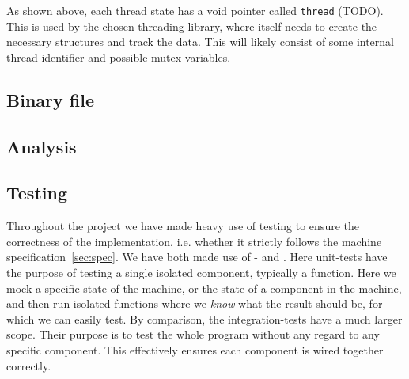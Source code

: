 As shown above, each thread state has a void pointer called {\tt thread}
(TODO). This is used by the chosen threading library, where itself needs to
create the necessary structures and track the data. This will likely consist of
some internal thread identifier and possible mutex variables.


\subsection{Binary file}








\subsection{Analysis}

\subsection{Testing}


Throughout the project we have made heavy use of testing to ensure the
correctness of the implementation, i.e. whether it strictly follows the machine
specification~\ref{sec:spec}. We have both made use of - and
. Here unit-tests have the purpose of testing a single
isolated component, typically a function. Here we mock a specific state of the
machine, or the state of a component in the machine, and then run isolated
functions where we {\it know} what the result should be, for which we can easily
test. By comparison, the integration-tests have a much larger scope. Their
purpose is to test the whole program without any regard to any specific
component. This effectively ensures each component is wired together correctly.

